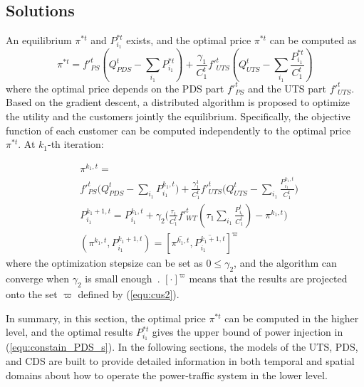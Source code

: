 \documentclass[final]{IEEEtran}
\begin{document}
\subsection{Solutions}
An equilibrium $\pi^{*t}$ and $P^{*t}_{i_1}$ exists, and the optimal price $\pi^{*t}$ can be computed as~\cite{boyd2004conv456ex,li2011opt789imal}
\begin{equation}\label{equ:opti}
\pi^{*t} = f'^t_{PS}(Q^t_{PDS} - \sum_{i_1}P^{*t}_{i_1}) + \frac{\gamma_1}{C^t_1} f'^t_{UTS}(Q^t_{UTS} - \sum_{i_1} \frac{P^{*t}_{i_1}}{C^t_1})
\end{equation}  
where the optimal price depends on the PDS part $f'^t_{PS}$ and the UTS part $f'^t_{UTS}$. Based on the gradient descent, a distributed algorithm is proposed to optimize the utility and the customers jointly the equilibrium. Specifically, the objective function of each customer can be computed independently to the optimal price $\pi^{*t}$.
At $k_1$-th iteration:

\begin{subequations}\label{equ:equ_iter}
	\begin{align}
	& \pi^{k_1,t} = \nonumber\\
	& f'^t_{PS}\bigg(Q^{t}_{PDS} - \sum_{i_1}P^{k_1,t}_{i_1}\bigg) + \frac{\gamma^1_1}{C^t_1} f'^t_{UTS}\bigg(Q^{t}_{UTS} - \sum_{i_1} \frac{P^{k_1,t}_{i_1}}{C^t_1}\bigg) \label{equ:priceup}\\
	& P^{k_1+1, t}_{i_1} = P^{k_1, t}_{i_1} + \gamma_2\bigg(\frac{\tau_1}{C^t_1}f'^t_{WT}(\tau_1\sum_{i_1}\frac{P^t_{i_1}}{C^t_1})-\pi^{k_1,t}\bigg) \label{equ:powerup}\\
	& (\pi^{k_1,t}, P^{k_1+1, t}_{i_1}) = [\overline{\pi^{k_1,t}}, \overline{P^{k_1+1, t}_{i_1}}]^{\varpi}
	\end{align}
\end{subequations}
where the optimization stepsize can be set as $0 \leq \gamma_2$, and the algorithm can converge when $\gamma_2$ is small enough~\cite{bert123sekas1989parallel}. $[\cdot]^{\varpi}$ means that the results are projected onto the set $\varpi$ defined by (\ref{equ:cus2}).

In summary, in this section, the optimal price $\pi^{*t}$ can be computed in the higher level, and the optimal results $P^{*t}_{i_1}$ gives the upper bound of power injection in (\ref{equ:constain_PDS_s}). In the following sections, the models of the UTS, PDS, and CDS are built to provide detailed information in both temporal and spatial domains about how to operate the power-traffic system in the lower level.
\end{document}

